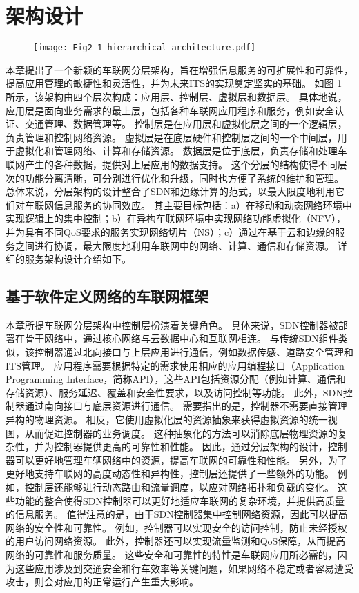 \section{架构设计}\label{section 2-2}

\begin{figure}[h] 
	\centering
	\texttt{[image: Fig2-1-hierarchical-architecture.pdf]}
	\label{fig 2-1}
\end{figure}

本章提出了一个新颖的车联网分层架构，旨在增强信息服务的可扩展性和可靠性，提高应用管理的敏捷性和灵活性，并为未来ITS的实现奠定坚实的基础。
如图 \ref{fig 2-1} 所示，该架构由四个层次构成：应用层、控制层、虚拟层和数据层。
具体地说，应用层是面向业务需求的最上层，包括各种车联网应用程序和服务，例如安全认证、交通管理、数据管理等。
控制层是在应用层和虚拟化层之间的一个逻辑层，负责管理和控制网络资源。
虚拟层是在底层硬件和控制层之间的一个中间层，用于虚拟化和管理网络、计算和存储资源。
数据层是位于底层，负责存储和处理车联网产生的各种数据，提供对上层应用的数据支持。
这个分层的结构使得不同层次的功能分离清晰，可分别进行优化和升级，同时也方便了系统的维护和管理。
总体来说，分层架构的设计整合了SDN和边缘计算的范式，以最大限度地利用它们对车联网信息服务的协同效应。
其主要目标包括：a）在移动和动态网络环境中实现逻辑上的集中控制；b）在异构车联网环境中实现网络功能虚拟化（NFV），并为具有不同QoS要求的服务实现网络切片（NS）；c）通过在基于云和边缘的服务之间进行协调，最大限度地利用车联网中的网络、计算、通信和存储资源。
详细的服务架构设计介绍如下。

\subsection{基于软件定义网络的车联网框架}

本章所提车联网分层架构中控制层扮演着关键角色。
具体来说，SDN控制器被部署在骨干网络中，通过核心网络与云数据中心和互联网相连。
与传统SDN组件类似，该控制器通过北向接口与上层应用进行通信，例如数据传感、道路安全管理和ITS管理。
应用程序需要根据特定的需求使用相应的应用编程接口（Application Programming Interface，简称API），这些API包括资源分配（例如计算、通信和存储资源）、服务延迟、覆盖和安全性要求，以及访问控制等功能。
此外，SDN控制器通过南向接口与底层资源进行通信。
需要指出的是，控制器不需要直接管理异构的物理资源。
相反，它使用虚拟化层的资源抽象来获得虚拟资源的统一视图，从而促进控制器的业务调度。
这种抽象化的方法可以消除底层物理资源的复杂性，并为控制器提供更高的可靠性和性能。
因此，通过分层架构的设计，控制器可以更好地管理车辆网络中的资源，提高车联网的可靠性和性能。
另外，为了更好地支持车联网的高度动态性和异构性，控制层还提供了一些额外的功能。
例如，控制层还能够进行动态路由和流量调度，以应对网络拓扑和负载的变化。
这些功能的整合使得SDN控制器可以更好地适应车联网的复杂环境，并提供高质量的信息服务。
值得注意的是，由于SDN控制器集中控制网络资源，因此可以提高网络的安全性和可靠性。
例如，控制器可以实现安全的访问控制，防止未经授权的用户访问网络资源。
此外，控制器还可以实现流量监测和QoS保障，从而提高网络的可靠性和服务质量。
这些安全和可靠性的特性是车联网应用所必需的，因为这些应用涉及到交通安全和行车效率等关键问题，如果网络不稳定或者容易遭受攻击，则会对应用的正常运行产生重大影响。

